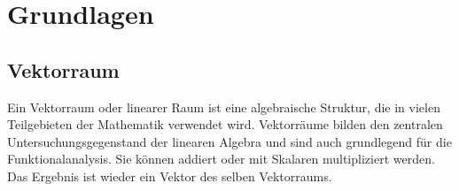 \documentclass[10pt,a4paper]{article}
\theoremstyle{plain}
\theoremstyle{definition}
\theoremstyle{nonumberplain}
\begin{document}
\section{Grundlagen}
\subsection{Vektorraum}

Ein Vektorraum oder linearer Raum ist eine algebraische Struktur, die in vielen Teilgebieten der Mathematik verwendet wird. Vektorräume bilden den zentralen Untersuchungsgegenstand der linearen Algebra und sind auch grundlegend für die Funktionalanalysis. Sie können addiert oder mit Skalaren multipliziert werden. Das Ergebnis ist wieder ein Vektor des selben Vektorraums.
\end{document}
